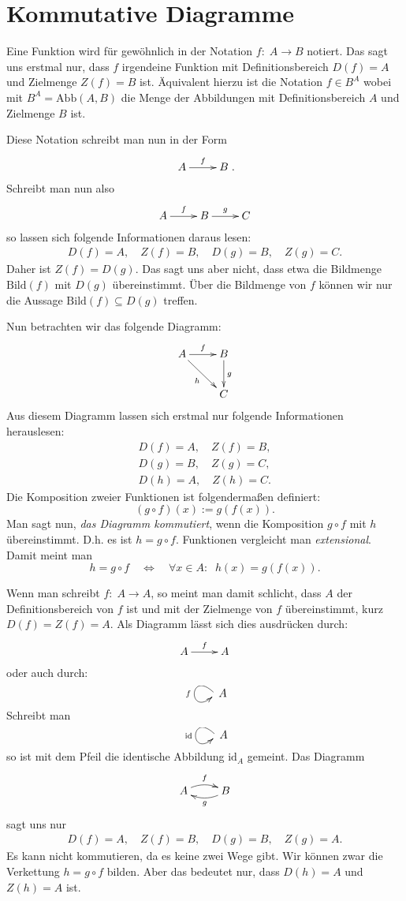 \documentclass[a4paper,12pt,fleqn]{article}
\begin{document}
\section*{Kommutative Diagramme}

Eine Funktion wird für gewöhnlich in der Notation
\(f{:}\;A\rightarrow B\) notiert. Das sagt uns erstmal nur,
dass \(f\) irgendeine Funktion mit Definitionsbereich
\(D(f)=A\) und Zielmenge \(Z(f)=B\) ist. Äquivalent hierzu ist
die Notation \(f{\in}B^A\) wobei mit
\(B^A=\mathrm{Abb}(A,B)\) die Menge der Abbildungen mit
Definitionsbereich \(A\) und Zielmenge \(B\) ist.

Diese Notation schreibt man nun in der Form
\[\xymatrix{A \ar[r]^f & B}.\]
Schreibt man nun also
\[\xymatrix{A \ar[r]^f & B \ar[r]^g & C}\]
so lassen sich folgende Informationen daraus lesen:
\begin{gather*}
D(f)=A,\quad Z(f)=B,\quad D(g)=B,\quad Z(g)=C.
\end{gather*}
Daher ist \(Z(f)=D(g)\). Das sagt uns aber nicht, dass etwa die
Bildmenge \(\mathrm{Bild}(f)\) mit \(D(g)\) übereinstimmt.
Über die Bildmenge von \(f\) können wir nur die Aussage
\(\mathrm{Bild}(f)\subseteq D(g)\) treffen.

Nun betrachten wir das folgende Diagramm:
\[\xymatrix{A \ar[r]^f \ar[dr]_h & B\ar[d]^g\\
& C}
\]
Aus diesem Diagramm lassen sich erstmal nur folgende
Informationen herauslesen:
\begin{gather*}
D(f)=A,\quad Z(f)=B,\\
D(g)=B,\quad Z(g)=C,\\
D(h)=A,\quad Z(h)=C.
\end{gather*}
Die Komposition zweier Funktionen ist folgendermaßen definiert:
\[(g\circ f)(x):=g(f(x)).\]
Man sagt nun, \textit{das Diagramm kommutiert}, wenn die Komposition
\(g\circ f\) mit \(h\) übereinstimmt. D.h. es ist \(h=g\circ f\).
Funktionen vergleicht man \textit{extensional}. Damit meint man
\[h=g\circ f \quad\Longleftrightarrow\quad \forall x{\in}A{:}\;\;
h(x)=g(f(x)).\]

Wenn man schreibt \(f{:}\; A\rightarrow A\), so meint man damit
schlicht, dass \(A\) der Definitionsbereich von \(f\) ist und
mit der Zielmenge von \(f\) übereinstimmt, kurz \(D(f)=Z(f)=A\). Als Diagramm lässt sich
dies ausdrücken durch:
\[\xymatrix{A\ar[r]^f & A}\]
oder auch durch:
\[\xymatrix{\ar@(ul,dl)_f}A\]
Schreibt man
\[\xymatrix{\ar@(ul,dl)_{\mathrm{id}}}A\]
so ist mit dem Pfeil die identische Abbildung \(\mathrm{id}_A\)
gemeint. Das Diagramm
\[\xymatrix{A \ar@/^/[r]^f & \ar@/^/[l]^g B}\]
sagt uns nur
\begin{gather*}
D(f)=A,\quad Z(f)=B,\quad D(g)=B,\quad Z(g)=A.
\end{gather*}
Es kann nicht kommutieren, da es keine zwei Wege gibt.
Wir können zwar die Verkettung \(h=g\circ f\) bilden. Aber das
bedeutet nur, dass \(D(h)=A\) und \(Z(h)=A\) ist.
\end{document}

